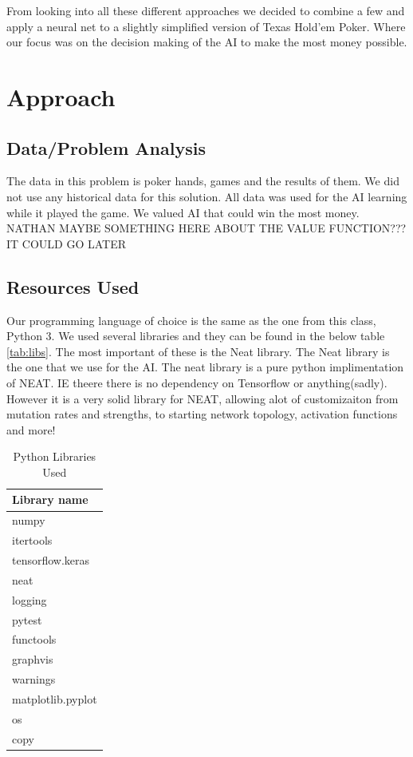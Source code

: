 From looking into all these different approaches we decided to combine a few and apply a neural net to a slightly simplified version of Texas Hold'em Poker. Where our focus was on the decision making of the AI to make the most money possible.

\section{Approach}
\subsection{Data/Problem Analysis}
The data in this problem is poker hands, games and the results of them. We did not use any historical data for
this solution. All data was used for the AI learning while it played the game. We valued AI that could win the
most money. NATHAN MAYBE SOMETHING HERE ABOUT THE VALUE FUNCTION??? IT COULD GO LATER

\subsection{Resources Used}
Our programming language of choice is the same as the one from this class, Python 3. We used several libraries
and they can be found in the below table \autoref{tab:libs}. The most important of these is the Neat library.
The Neat library is the one that we use for the AI. The neat library is a pure python implimentation of NEAT.
IE theere there is no dependency on Tensorflow or anything(sadly). However it is a very solid library for NEAT,
allowing alot of customizaiton from mutation rates and strengths, to starting network topology, activation
functions and more!

\begin{table}[H]
    \caption{Python Libraries Used}
    \centering
    \begin{tabular}{ | l |}
    \hline
        Library name \\
        \hline
        \hline
        numpy \\
        itertools \\
        tensorflow.keras \\
        neat \\
        logging \\
        pytest \\
        functools \\
        graphvis \\
        warnings \\
        matplotlib.pyplot \\
        os \\
        copy \\
        
    \hline
    \end{tabular}
    \label{tab:libs}
\end{table}

